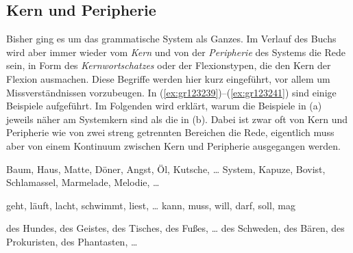 \subsection{Kern und Peripherie}

\label{sec:kernundperipherie}


Bisher ging es um das grammatische System als Ganzes.
Im Verlauf des Buchs wird aber immer wieder vom \textit{Kern} und von der \textit{Peripherie} des Systems die Rede sein, \zB in Form des \textit{Kernwortschatzes} oder der Flexionstypen, die den Kern der Flexion ausmachen.
Diese Begriffe werden hier kurz eingeführt, vor allem um Missverständnissen vorzubeugen.
In (\ref{ex:gr123239})--(\ref{ex:gr123241}) sind einige Beispiele aufgeführt.
Im Folgenden wird erklärt, warum die Beispiele in (a) jeweils näher am Systemkern sind als die in (b).
Dabei ist zwar oft von Kern und Peripherie wie von zwei streng getrennten Bereichen die Rede, eigentlich muss aber von einem Kontinuum zwischen Kern und Peripherie ausgegangen werden.

\begin{exe}
	\ex\label{ex:gr123239}
	\begin{xlist}
		\ex\label{ex:gr123239a} Baum, Haus, Matte, Döner, Angst, Öl, Kutsche, \ldots
		\ex\label{ex:gr123239b} System, Kapuze, Bovist, Schlamassel, Marmelade, Melodie, \ldots
	\end{xlist}
	\ex\label{ex:gr123240}
	\begin{xlist}
		\ex\label{ex:gr123240a} geht, läuft, lacht, schwimmt, liest, \ldots
		\ex\label{ex:gr123240b} kann, muss, will, darf, soll, mag 
	\end{xlist}
	\ex\label{ex:gr123241}
	\begin{xlist}
		\ex\label{ex:gr123241a} des Hundes, des Geistes, des Tisches, des Fußes, \ldots
		\ex\label{ex:gr123241b} des Schweden, des Bären, des Prokuristen, des Phantasten, \ldots
	\end{xlist}
\end{exe}


